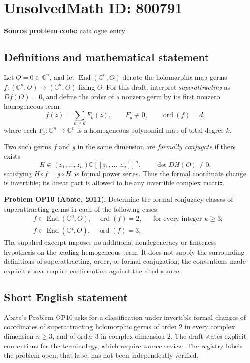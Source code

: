 \documentclass[11pt]{article}
\newcommand{\C}{\mathbb{C}}
\begin{document}
\section*{UnsolvedMath ID: 800791}
\textbf{Source problem code:} catalogue entry
\subsection{Definitions and mathematical statement}
Let \(O=0\in\C^n\), and let \(\operatorname{End}(\C^n,O)\) denote the holomorphic map germs \(f:(\C^n,O)\to(\C^n,O)\) fixing \(O\). For this draft, interpret \emph{superattracting} as \(Df(O)=0\), and define the order of a nonzero germ by its first nonzero homogeneous term:
\[
f(z)=\sum_{k\ge d}F_k(z),\qquad F_d\not\equiv0,\qquad \operatorname{ord}(f)=d,
\]
where each \(F_k:\C^n\to\C^n\) is a homogeneous polynomial map of total degree \(k\).

Two such germs \(f\) and \(g\) in the same dimension are \emph{formally conjugate} if there exists
\[
H\in (z_1,\ldots,z_n)\C[[z_1,\ldots,z_n]]^n,
\qquad \det DH(O)\ne0,
\]
satisfying \(H\circ f=g\circ H\) as formal power series. Thus the formal coordinate change is invertible; its linear part is allowed to be any invertible complex matrix.

\textbf{Problem OP10 (Abate, 2011).} Determine the formal conjugacy classes of superattracting germs in each of the following cases:
\[
\begin{aligned}
&f\in\operatorname{End}(\C^n,O),\quad \operatorname{ord}(f)=2,
&&\text{for every integer }n\ge3;\\
&f\in\operatorname{End}(\C^2,O),\quad \operatorname{ord}(f)=3.
\end{aligned}
\]
The supplied excerpt imposes no additional nondegeneracy or finiteness hypothesis on the leading homogeneous term. It does not supply the surrounding definitions of superattracting, order, or formal conjugation; the conventions made explicit above require confirmation against the cited source.
\subsection{Short English statement}
Abate's Problem OP10 asks for a classification under invertible formal changes of coordinates of superattracting holomorphic germs of order \(2\) in every complex dimension \(n\ge3\), and of order \(3\) in complex dimension \(2\). The draft states explicit conventions for the terminology, which require source review. The registry labels the problem open; that label has not been independently verified.
\end{document}
